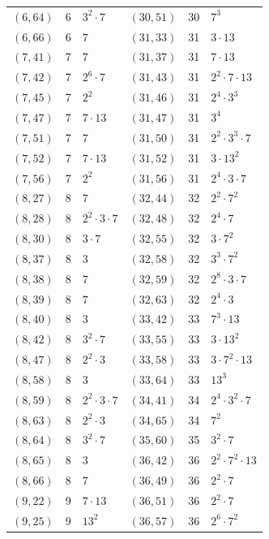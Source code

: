 \documentclass[11pt]{article}
\begin{document}
\begin{longtable}{@{}lrl@{\qquad}lrl@{}}
$(6,64)$ & 6 & $3^{2}\cdot 7$ & $(30,51)$ & 30 & $7^{3}$\\
$(6,66)$ & 6 & $7$ & $(31,33)$ & 31 & $3\cdot 13$\\
$(7,41)$ & 7 & $7$ & $(31,37)$ & 31 & $7\cdot 13$\\
$(7,42)$ & 7 & $2^{6}\cdot 7$ & $(31,43)$ & 31 & $2^{2}\cdot 7\cdot 13$\\
$(7,45)$ & 7 & $2^{2}$ & $(31,46)$ & 31 & $2^{4}\cdot 3^{3}$\\
$(7,47)$ & 7 & $7\cdot 13$ & $(31,47)$ & 31 & $3^{4}$\\
$(7,51)$ & 7 & $7$ & $(31,50)$ & 31 & $2^{2}\cdot 3^{3}\cdot 7$\\
$(7,52)$ & 7 & $7\cdot 13$ & $(31,52)$ & 31 & $3\cdot 13^{2}$\\
$(7,56)$ & 7 & $2^{2}$ & $(31,56)$ & 31 & $2^{4}\cdot 3\cdot 7$\\
$(8,27)$ & 8 & $7$ & $(32,44)$ & 32 & $2^{2}\cdot 7^{2}$\\
$(8,28)$ & 8 & $2^{2}\cdot 3\cdot 7$ & $(32,48)$ & 32 & $2^{4}\cdot 7$\\
$(8,30)$ & 8 & $3\cdot 7$ & $(32,55)$ & 32 & $3\cdot 7^{2}$\\
$(8,37)$ & 8 & $3$ & $(32,58)$ & 32 & $3^{3}\cdot 7^{2}$\\
$(8,38)$ & 8 & $7$ & $(32,59)$ & 32 & $2^{8}\cdot 3\cdot 7$\\
$(8,39)$ & 8 & $7$ & $(32,63)$ & 32 & $2^{4}\cdot 3$\\
$(8,40)$ & 8 & $3$ & $(33,42)$ & 33 & $7^{3}\cdot 13$\\
$(8,42)$ & 8 & $3^{2}\cdot 7$ & $(33,55)$ & 33 & $3\cdot 13^{2}$\\
$(8,47)$ & 8 & $2^{2}\cdot 3$ & $(33,58)$ & 33 & $3\cdot 7^{2}\cdot 13$\\
$(8,58)$ & 8 & $3$ & $(33,64)$ & 33 & $13^{3}$\\
$(8,59)$ & 8 & $2^{2}\cdot 3\cdot 7$ & $(34,41)$ & 34 & $2^{4}\cdot 3^{2}\cdot 7$\\
$(8,63)$ & 8 & $2^{2}\cdot 3$ & $(34,65)$ & 34 & $7^{2}$\\
$(8,64)$ & 8 & $3^{2}\cdot 7$ & $(35,60)$ & 35 & $3^{2}\cdot 7$\\
$(8,65)$ & 8 & $3$ & $(36,42)$ & 36 & $2^{2}\cdot 7^{2}\cdot 13$\\
$(8,66)$ & 8 & $7$ & $(36,49)$ & 36 & $2^{2}\cdot 7$\\
$(9,22)$ & 9 & $7\cdot 13$ & $(36,51)$ & 36 & $2^{2}\cdot 7$\\
$(9,25)$ & 9 & $13^{2}$ & $(36,57)$ & 36 & $2^{6}\cdot 7^{2}$\\

\end{longtable}
\end{document}
